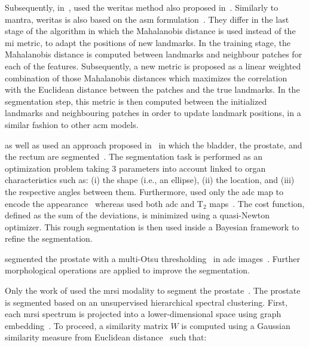 Subsequently, \citeauthor{Viswanath2012} in~\cite{Viswanath2012}, used the \ac{weritas} method also proposed in~\citeauthor{Toth2009}.
Similarly to \ac{mantra}, \ac{weritas} is also based on the \ac{asm} formulation~\cite{Toth2009}.
They differ in the last stage of the algorithm in which the Mahalanobis distance is used instead of the \ac{mi} metric, to adapt the positions of new landmarks.
In the training stage, the Mahalanobis distance is computed between landmarks and neighbour patches for each of the features.
Subsequently, a new metric is proposed as a linear weighted combination of those Mahalanobis distances which maximizes the correlation with the Euclidean distance between the patches and the true landmarks.
In the segmentation step, this metric is then computed between the initialized landmarks and neighbouring patches in order to update landmark positions, in a similar fashion to other \ac{acm} models.

\citeauthor{Litjens2011} as well as \citeauthor{Vos2012} used an approach proposed in~\cite{Huisman2010} in which the bladder, the prostate, and the rectum are segmented~\cite{Litjens2011,Vos2012}.
The segmentation task is performed as an optimization problem taking 3 parameters into account linked to organ characteristics such as: (i) the shape (i.e., an ellipse), (ii) the location, and (iii) the respective angles between them.
Furthermore, \citeauthor{Litjens2011} used only the \ac{adc} map to encode the appearance~\cite{Litjens2011} whereas \citeauthor{Vos2012} used both \ac{adc} and T$_2$ maps~\cite{Vos2012}.
The cost function, defined as the sum of the deviations, is minimized using a quasi-Newton optimizer.
This rough segmentation is then used inside a Bayesian framework to refine the segmentation.

\citeauthor{giannini2015fully} segmented the prostate with a multi-Otsu thresholding~\cite{otsu1975threshold} in \ac{adc} images~\cite{giannini2015fully}.
Further morphological operations are applied to improve the segmentation.

Only the work of \citeauthor{Tiwari2009} used the \ac{mrsi} modality to segment the prostate~\cite{Tiwari2009}.
The prostate is segmented based on an unsupervised hierarchical spectral clustering.
First, each \ac{mrsi} spectrum is projected into a lower-dimensional space using graph embedding~\cite{Shi2000}.
To proceed, a similarity matrix $W$ is computed using a Gaussian similarity measure from Euclidean distance~\cite{Belkin2001} such that:

